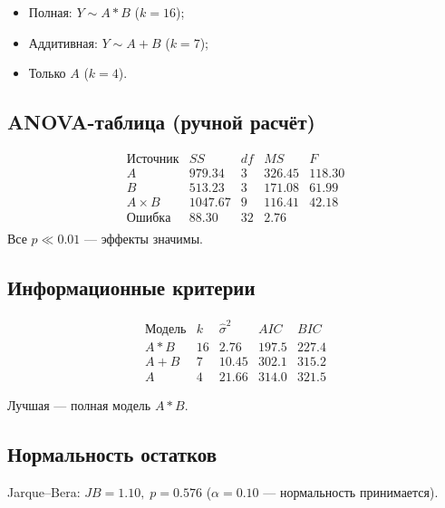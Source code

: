 \documentclass[12pt]{article}
\begin{document}
\begin{itemize}
  \item Полная: \(Y\sim A*B\) (\(k=16\));
  \item Аддитивная: \(Y\sim A+B\) (\(k=7\));
  \item Только \(A\) (\(k=4\)).
\end{itemize}

\subsection{ANOVA-таблица (ручной расчёт)}

\[
\begin{array}{l|cccc}
\text{Источник} & SS & df & MS & F \\ \hline
A   & 979.34 & 3 & 326.45 & 118.30 \\
B   & 513.23 & 3 & 171.08 & 61.99  \\
A\times B & 1047.67 & 9 & 116.41 & 42.18 \\
Ошибка   & 88.30 & 32 & 2.76 &        \\
\end{array}
\]
Все \(p\ll0.01\) — эффекты значимы.

\subsection{Информационные критерии}

\[
\begin{array}{l|ccccc}
\text{Модель} & k & \hat\sigma^2 & AIC & BIC \\ \hline
A*B & 16 & 2.76 & 197.5 & 227.4 \\
A+B &  7 & 10.45 & 302.1 & 315.2 \\
A   &  4 & 21.66 & 314.0 & 321.5
\end{array}
\]

Лучшая — полная модель \(A*B\).

\subsection{Нормальность остатков}

Jarque–Bera: \(JB = 1.10,\; p = 0.576\) (\(\alpha=0.10\) — нормальность принимается).

\end{document}
